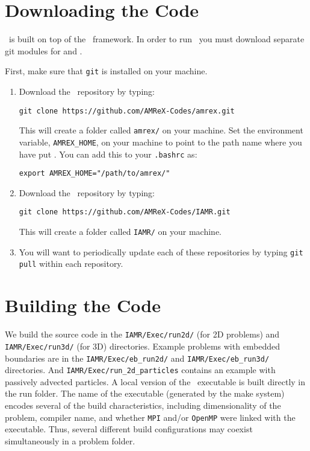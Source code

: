 
\section{Downloading the Code}

\iamr\ is built on top of the \amrex\ framework.  In order to run
\iamr\, you must download separate git modules for \iamr and \amrex.

\vspace{.1in}

\noindent First, make sure that {\tt git} is installed on your machine.

\vspace{.1in}

\begin{enumerate}

\item Download the \amrex\ repository by typing: 
\begin{verbatim}
git clone https://github.com/AMReX-Codes/amrex.git
\end{verbatim}

This will create a folder called {\tt amrex/} on your machine.
Set the environment variable, {\tt AMREX\_HOME}, on your
machine to point to the path name where you have put \amrex.
You can add this to your {\tt .bashrc} as:
\begin{verbatim}
export AMREX_HOME="/path/to/amrex/"
\end{verbatim}

\item Download the \iamr\ repository by typing: 
\begin{verbatim}
git clone https://github.com/AMReX-Codes/IAMR.git
\end{verbatim}

This will create a folder called {\tt IAMR/} on your machine.

\item You will want to periodically update each of these repositories
by typing {\tt git pull} within each repository.

\end{enumerate}


\section{Building the Code}

We build the source code in the {\tt IAMR/Exec/run2d/} (for 2D problems) and {\tt IAMR/Exec/run3d/} 
(for 3D) directories.
Example problems with embedded boundaries are in the {\tt IAMR/Exec/eb\_run2d/} and
{\tt IAMR/Exec/eb\_run3d/} directories.
And {\tt IAMR/Exec/run\_2d\_particles} contains an example with passively advected particles.
A local version of the 
\iamr\ executable is built directly in the run folder.  The name of the executable (generated by the make
system) encodes several of the build characteristics, including dimensionality of the problem,
compiler name, and whether {\tt MPI} and/or {\tt OpenMP} were linked with the executable.
Thus, several different build configurations may coexist simultaneously in a problem folder.


